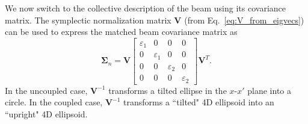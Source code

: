 We now switch to the collective description of the beam using its covariance matrix. The symplectic normalization matrix $\mathbf{V}$ (from Eq.~\eqref{eq:V_from_eigvecs}) can be used to express the matched beam covariance matrix as
%
\begin{equation}\label{eq:sigma_n}
    \bm{\Sigma}_n = 
    \mathbf{V}
    \begin{bmatrix}
        \varepsilon_1 & 0 & 0 & 0 \\
        0& \varepsilon_1 & 0 & 0 \\
        0 & 0 & \varepsilon_2 & 0 \\
        0 & 0 & 0 & \varepsilon_2
    \end{bmatrix}
    \mathbf{V}^T.
\end{equation}
%
In the uncoupled case, $\mathbf{V}^{-1}$ transforms a tilted ellipse in the $x$-$x'$ plane into a circle. In the coupled case, $\mathbf{V}^{-1}$ transforms a ``tilted" 4D ellipsoid into an ``upright" 4D ellipsoid.

